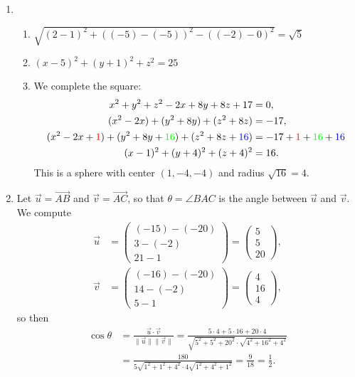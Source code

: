 \begin{enumerate}
\begin{enumerate}
\end{enumerate}
\item \begin{enumerate}
\item $\sqrt{(2 - 1)^2 + ((-5) - (-5))^2 - ((-2) - 0)^2} = \sqrt{5}$
\item $(x - 5)^2 + (y + 1)^2 + z^2 = 25$
\item We complete the square:
\begin{align*}
x^2 + y^2 + z^2 - 2x + 8y + 8z + 17 &= 0, \\
(x^2 - 2x) + (y^2 + 8y) + (z^2 + 8z) &= -17, \\
(x^2 - 2x + {\color{red}1}) + (y^2 + 8y + {\color{green}16}) + (z^2 + 8z + {\color{blue}16}) &= -17 + {\color{red}1} + {\color{green}16} + {\color{blue}16} \\
(x - 1)^2 + (y + 4)^2 + (z + 4)^2 &= 16.
\end{align*}
This is a sphere with center $(1,-4,-4)$ and radius $\sqrt{16} = 4$.
\end{enumerate}
\item Let $\vec{u} = \overrightarrow{AB}$ and $\vec{v} = \overrightarrow{AC}$, so that $\theta = \angle BAC$ is the angle between $\vec{u}$ and $\vec{v}$. We compute
\begin{align*}
\vec{u} &= \begin{pmatrix} (-15) - (-20) \\ 3 - (-2) \\ 21 - 1 \end{pmatrix} = \begin{pmatrix} 5 \\ 5 \\ 20 \end{pmatrix}, \\
\vec{v} &= \begin{pmatrix} (-16) - (-20) \\ 14 - (-2) \\ 5 - 1 \end{pmatrix} = \begin{pmatrix} 4 \\ 16 \\ 4 \end{pmatrix},
\end{align*}
so then
\begin{align*}
\cos\theta &= \frac{\vec{u}\cdot\vec{v}}{\|\vec{u}\|\|\vec{v}\|} = \frac{5\cdot 4 + 5\cdot 16 + 20\cdot 4}{\sqrt{5^2 + 5^2 + 20^2}\cdot\sqrt{4^2 + 16^2 + 4^2}} \\
&= \frac{180}{5\sqrt{1^2 + 1^2 + 4^2}\cdot 4\sqrt{1^2 + 4^2 + 1^2}} = \frac{9}{18} = \frac{1}{2}.

\end{align*}
\end{enumerate}
